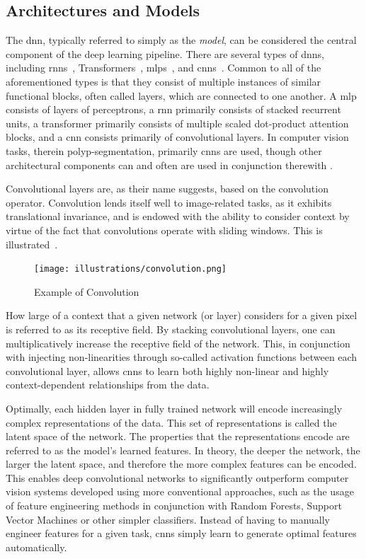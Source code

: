     \subsection{Architectures and Models}
        The \gls{dnn}, typically referred to simply as the \textit{model}, can be considered the central component of the deep learning pipeline. There are several types of \glspl{dnn}, including \glspl{rnn}~\cite{rnns}, Transformers~\cite{transformer}, \glspl{mlp}~\cite{neural_nets}, and \glspl{cnn}~\cite{cnn_survey}. Common to all of the aforementioned types is that they consist of multiple instances of similar functional blocks, often called layers, which are connected to one another. A \gls{mlp} consists of layers of perceptrons, a \gls{rnn} primarily consists of stacked recurrent units, a transformer primarily consists of multiple scaled dot-product attention blocks, and a \gls{cnn} consists primarily of convolutional layers. In computer vision tasks, therein polyp-segmentation, primarily  \glspl{cnn} are used, though other architectural components can and often are used in conjunction therewith \cite{computer_vision}.
        
        Convolutional layers are, as their name suggests, based on the convolution operator. Convolution lends itself well to image-related tasks, as it exhibits translational invariance, and is endowed with the ability to consider context by virtue of the fact that convolutions operate with sliding windows. This is illustrated~. 
        
        \begin{figure}[htb]
            \centering
        \texttt{[image: illustrations/convolution.png]}
            \caption{Example of Convolution}
            \label{fig:convolution}
        \end{figure}
        
        How large of a context that a given network (or layer) considers for a given pixel is referred to as its receptive field. By stacking convolutional layers, one can multiplicatively increase the receptive field of the network. This, in conjunction with injecting non-linearities through so-called activation functions between each convolutional layer, allows \glspl{cnn} to learn  both highly non-linear and highly context-dependent relationships from the data. 
        
        Optimally, each hidden layer in fully trained network will encode increasingly complex representations of the data. This set of representations is called the latent space of the network. The properties that the representations encode are referred to as the model's learned features. In theory, the deeper the network, the larger the latent space, and therefore the more complex features can be encoded. This enables deep convolutional networks to significantly outperform computer vision systems developed using more conventional approaches, such as the usage of feature engineering methods in conjunction with Random Forests, Support Vector Machines or other simpler classifiers. Instead of having to manually engineer features for a given task, \glspl{cnn} simply learn to generate optimal features automatically.
        
